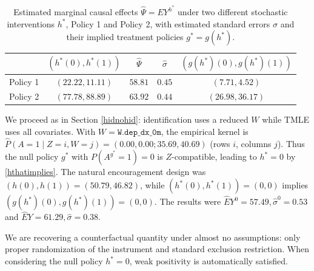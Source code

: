 \documentclass[12pt]{article}
\theoremstyle{thmstyleone}%
\theoremstyle{thmstyletwo}%
\theoremstyle{thmstylethree}%
\begin{document}
\begin{table}[h!]
	\centering
	\begin{tabular}{lcccc}
		\hline
		& $(h^*(0), h^*(1))$ & $\hat{\Psi}$ & $\hat{\sigma}$ & $(g(h^*)(0), g(h^*)(1))$ \\
		\hline
		Policy 1 & $(22.22, 11.11)$ & $58.81$ & $0.45$ & $(7.71, 4.52)$ \\
		Policy 2 & $(77.78, 88.89)$ & $63.92$ & $0.44$ & $(26.98, 36.17)$ \\
		\hline
	\end{tabular}
	\caption{Estimated marginal causal effects $\hat{\Psi}=EY^{h^*}$ under two different stochastic interventions $h^*$, Policy 1 and Policy 2, with estimated standard errors $\hat{\sigma}$ and their implied treatment policies $g^* = g(h^*)$.}
\end{table}

We proceed as in Section \ref{hidnohid}: identification uses a reduced $W$ while TMLE uses all covariates. With $W=\texttt{W.dep\_dx\_0m}$, the empirical kernel is $\widehat P(A = 1 \mid Z = i, W = j) = (0.00, 0.00;35.69,40.69)$ (rows $i$, columns $j$). Thus the null policy $g^*$ with $P(A^{g^*}=1)=0$ is $Z$-compatible, leading to $h^*=0$ by \eqref{hthatimplies}. The natural encouragement design was $(h(0),h(1))=(50.79,46.82)$, while $(h^*(0),h^*(1))=(0,0)$ implies $(g(h^*)(0),g(h^*)(1))=(0,0)$. The results were $\hat{E}Y^0 = 57.49, \hat{\sigma}^0 = 0.53$ and $\hat{E}Y = 61.29, \hat{\sigma} = 0.38$.


We are recovering a counterfactual quantity under almost no assumptions: only proper randomization of the instrument and standard exclusion restriction.  When considering the null policy $h^* = 0$, weak positivity is automatically satisfied.
\end{document}
